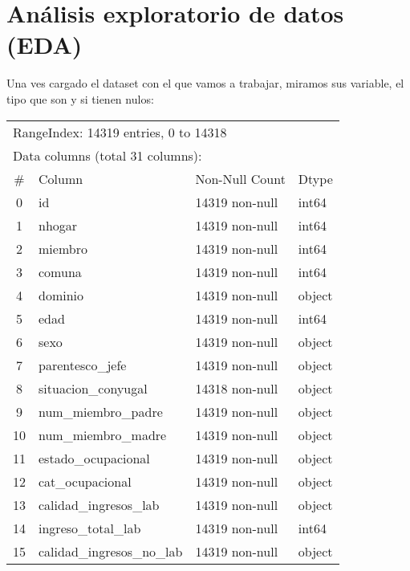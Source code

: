 \documentclass[a4paper]{article}
\begin{document}
\newpage

\section{Análisis exploratorio de datos (EDA)}

    Una ves cargado el dataset con el que vamos a trabajar, miramos sus variable, el tipo que son y si tienen nulos:
    \begin{table}[H]\begin{center}
    \begin{tabular}{clll}
    \multicolumn{4}{l}{RangeIndex: 14319 entries, 0 to 14318} \\
    \multicolumn{4}{l}{Data columns (total 31 columns):}  \\
    \#  & Column                     & Non-Null Count & Dtype \\ \hline
    0  & id                          & 14319 non-null & int64 \\ 
    1  & nhogar                      & 14319 non-null & int64 \\ 
    2  & miembro                     & 14319 non-null & int64 \\ 
    3  & comuna                      & 14319 non-null & int64 \\ 
    4  & dominio                     & 14319 non-null & object \\
    5  & edad                        & 14319 non-null & int64 \\ 
    6  & sexo                        & 14319 non-null & object \\
    7  & parentesco\_jefe             & 14319 non-null & object \\
    8  & situacion\_conyugal          & 14318 non-null & object \\
    9  & num\_miembro\_padre           & 14319 non-null & object \\
    10 & num\_miembro\_madre           & 14319 non-null & object \\
    11 & estado\_ocupacional          & 14319 non-null & object \\
    12 & cat\_ocupacional             & 14319 non-null & object \\
    13 & calidad\_ingresos\_lab        & 14319 non-null & object \\
    14 & ingreso\_total\_lab           & 14319 non-null & int64  \\
    15 & calidad\_ingresos\_no\_lab     & 14319 non-null & object \\

\end{tabular}
\end{center}
\end{table}
\end{document}
